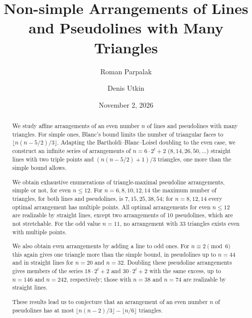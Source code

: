 \documentclass[oneside,reqno]{amsart}
\title[Non-simple Arrangements with Many Triangles]{Non-simple Arrangements of Lines\\ and Pseudolines with Many Triangles}
\author{Roman Parpalak}
\author{Denis Utkin}
\date{November 2, 2026}
\begin{document}
\begin{abstract}
We study affine arrangements of an even number $n$ of lines and pseudolines with many
triangles. For simple ones, Blanc's bound limits the number of triangular faces
to $\lfloor n(n-5/2)/3\rfloor$.
Adapting the Bartholdi--Blanc--Loisel doubling to the even case, we construct
an infinite series of arrangements of $n=6\cdot2^t+2$ ($8,14,26,50,\ldots$) straight lines with two
triple points and $(n(n-5/2)+1)/3$ triangles, one more than the simple bound
allows.

We obtain exhaustive enumerations of triangle-maximal pseudoline
arrangements, simple or not, for even $n\le12$. For $n=6,8,10,12,14$ the maximum
number of triangles, for both lines and pseudolines, is $7,15,25,38,54$; for
$n=8,12,14$ every optimal arrangement has multiple points. All optimal arrangements
for even $n\le12$ are realizable by straight lines, except two arrangements of 10
pseudolines, which are not stretchable. For the odd value $n=11$, no
arrangement with $33$ triangles exists even with multiple points.

We also obtain even arrangements by adding a line to odd ones. For
$n\equiv2\pmod 6$ this again gives one triangle more than the simple bound, in
pseudolines up to $n=44$ and in straight lines for $n=20$ and $n=32$.
Doubling these pseudoline arrangements gives members of the series
$18\cdot2^t+2$ and $30\cdot2^t+2$ with the same excess, up to $n=146$ and
$n=242$, respectively; those with $n=38$ and $n=74$ are realizable by straight lines.

These results lead us to conjecture that an arrangement of an even number $n$
of pseudolines has at most $\lfloor n(n-2)/3\rfloor-\lfloor n/6\rfloor$
triangles.
\end{abstract}

\maketitle







\appendix
{}




\clearpage


\end{document}
